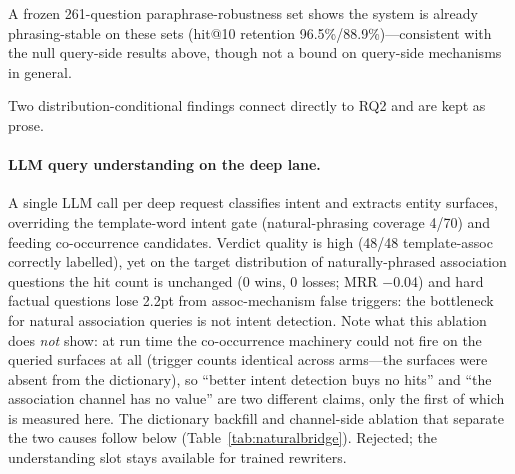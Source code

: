 \documentclass[sigconf,nonacm]{acmart}
\begin{document}
A frozen 261-question paraphrase-robustness set shows the system is
already phrasing-stable on these sets (hit@10 retention
96.5\%/88.9\%)---consistent with the null query-side results above,
though not a bound on query-side mechanisms in general.

Two distribution-conditional findings connect directly to RQ2 and are
kept as prose.

\paragraph{LLM query understanding on the deep lane.} A single LLM call
per deep request classifies intent and extracts entity surfaces, overriding
the template-word intent gate (natural-phrasing coverage 4/70) and feeding
co-occurrence candidates. Verdict quality is high (48/48 template-assoc
correctly labelled), yet on the target distribution of naturally-phrased
association questions the hit count is unchanged (0 wins, 0 losses; MRR
$-$0.04) and hard factual questions lose 2.2pt from assoc-mechanism false
triggers: the bottleneck for natural association queries is not intent
detection. Note what this ablation does \emph{not} show: at run time the
co-occurrence machinery could not fire on the queried surfaces at all
(trigger counts identical across arms---the surfaces were absent from the
dictionary), so ``better intent detection buys no hits'' and ``the
association channel has no value'' are two different claims, only the
first of which is measured here. The dictionary backfill and channel-side
ablation that separate the two causes follow below
(Table~\ref{tab:naturalbridge}). Rejected;
the understanding slot stays available for trained rewriters.
\end{document}
